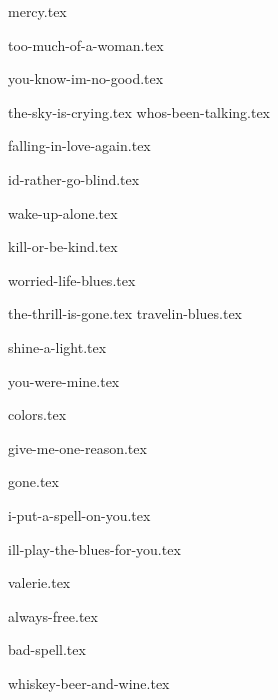 \begin{songs}{}

  {mercy.tex}
  \sclearpage

  {too-much-of-a-woman.tex}
  \sclearpage

  {you-know-im-no-good.tex}
  \sclearpage

  {the-sky-is-crying.tex}
  {whos-been-talking.tex}

  \sclearpage

  {falling-in-love-again.tex}  
  \sclearpage

  {id-rather-go-blind.tex}  
  \sclearpage
  
  {wake-up-alone.tex}
  \sclearpage
  
  {kill-or-be-kind.tex}
  \sclearpage
  
  {worried-life-blues.tex}
  \sclearpage

  {the-thrill-is-gone.tex}
  {travelin-blues.tex}

  \sclearpage

  {shine-a-light.tex}  
  \sclearpage

  {you-were-mine.tex}
  \sclearpage

  {colors.tex}
  \sclearpage

  {give-me-one-reason.tex}
  \sclearpage

  {gone.tex}
  \sclearpage

  {i-put-a-spell-on-you.tex}
  \sclearpage
  
  {ill-play-the-blues-for-you.tex}
  \sclearpage
    
  {valerie.tex}
  \sclearpage
  
  {always-free.tex}
  \sclearpage
  
  {bad-spell.tex}
  \sclearpage
  
  {whiskey-beer-and-wine.tex}
  \sclearpage

 \end{songs}
